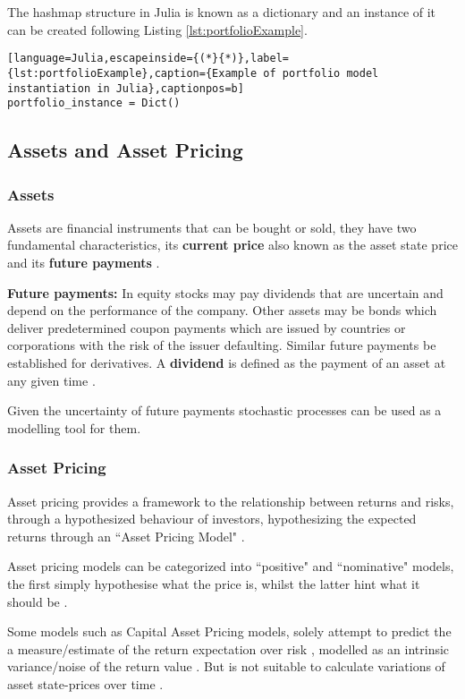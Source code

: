 The hashmap structure in Julia is known as a dictionary and an instance of it can be created following Listing \ref{lst:portfolioExample}.

\begin{lstlisting}[language=Julia,escapeinside={(*}{*)},label={lst:portfolioExample},caption={Example of portfolio model instantiation in Julia},captionpos=b]
portfolio_instance = Dict()
\end{lstlisting}

\subsection{Assets and Asset Pricing}
\subsubsection{Assets}
Assets are financial instruments that can be bought or sold, they have two fundamental characteristics, its \textbf{current price} also known as the asset state 
price and its \textbf{future payments} \cite{assetPricing}.

\textbf{Future payments:} In equity stocks may pay dividends that are uncertain and depend on the performance of the company. Other assets may be bonds which deliver predetermined coupon payments which are issued by countries or corporations with the risk of the issuer defaulting. Similar future payments be established for derivatives. A \textbf{dividend} is defined as the payment of an asset at any given time \cite{assetPricing}. 

Given the uncertainty of future payments stochastic processes can be used as a modelling tool for them\cite{assetPricing}.  

\subsubsection{Asset Pricing}
Asset pricing provides a framework to the relationship between returns and risks,  through a hypothesized behaviour of investors, hypothesizing the expected returns through an ``Asset Pricing Model" \cite{investment_management_book_2010}. 

Asset pricing models can be categorized into ``positive" and ``nominative" models, the first simply hypothesise what the price is, whilst the latter hint what it should be \cite{investment_management_book_2010}. 

Some models such as Capital Asset Pricing models, solely attempt to predict the a measure/estimate of the return expectation over risk , modelled  as an intrinsic variance/noise of the return value \cite{investment_management_book_2010}. But is not suitable to calculate variations of asset state-prices over time \cite{assetPricing}. 


